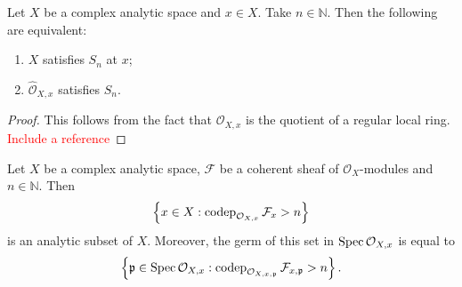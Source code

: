 \begin{proposition}\label{prop-Sncompletion}
    Let $X$ be a complex analytic space and $x\in X$. Take $n\in \mathbb{N}$. Then the following are equivalent:
    \begin{enumerate}
        \item $X$ satisfies $S_n$ at $x$;
        \item $\hat{\mathcal{O}}_{X,x}$ satisfies $S_n$.
    \end{enumerate}
\end{proposition}
\begin{proof}
    This follows from the fact that $\mathcal{O}_{X,x}$ is the quotient of a regular local ring. \textcolor{red}{Include a reference}
\end{proof}

\begin{proposition}\label{prop-coprofgnanal}
    Let $X$ be a complex analytic space, $\mathcal{F}$ be a coherent sheaf of $\mathcal{O}_X$-modules and $n\in \mathbb{N}$. Then 
    \[
        \left\{x\in X: \operatorname{codep}_{\mathcal{O}_{X,x}}\mathcal{F}_x> n \right\}
    \]
    is an analytic subset of $X$. Moreover, the germ of this set in $\operatorname{Spec} \mathcal{O}_{X,x}$ is equal to 
    \[
        \left\{\mathfrak{p}\in \operatorname{Spec} \mathcal{O}_{X,x}: \operatorname{codep}_{\mathcal{O}_{X,x,\mathfrak{p}}}\mathcal{F}_{x,\mathfrak{p}}> n \right\}. 
    \]
\end{proposition}

